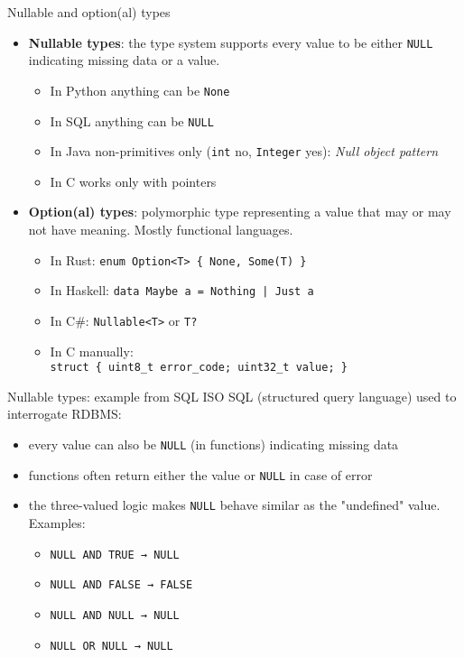 \documentclass[aspectratio=169,14pt]{beamer}
\begin{document}
\begin{frame}{Nullable and option(al) types}
\begin{itemize}
    \item \textbf{Nullable types}: the type system supports every value to be either \texttt{NULL} indicating missing data or a value.
    \begin{itemize}
        \item In Python anything can be \texttt{None}
        \item In SQL anything can be \texttt{NULL}
        \item In Java non-primitives only (\texttt{int} no, \texttt{Integer} yes): \textit{Null object pattern}
        \item In C works only with pointers
    \end{itemize}
    \item \textbf{Option(al) types}: polymorphic type representing a value that may or may not have meaning. Mostly functional languages.
    \begin{itemize}
        \item In Rust: \texttt{enum Option<T> \{ None, Some(T) \}}
        \item In Haskell: \texttt{data Maybe a = Nothing | Just a}
        \item In C\#: \texttt{Nullable<T>} or \texttt{T?}
        \item In C manually:\\ \texttt{struct \{ uint8\_t error\_code; uint32\_t value; \}}
    \end{itemize}
\end{itemize}
\end{frame}



\begin{frame}{Nullable types: example from SQL}
ISO SQL (structured query language) used to interrogate RDBMS:

\begin{itemize}
    \item every value can also be \texttt{NULL} (in functions) indicating missing data
    \item functions often return either the value or \texttt{NULL} in case of error
    \item the three-valued logic makes \texttt{NULL} behave similar as the "undefined" value. Examples:
    \begin{itemize}
        \item \texttt{NULL AND  TRUE → NULL}
        \item \texttt{NULL AND FALSE → FALSE}
        \item \texttt{NULL AND  NULL → NULL}
        \item \texttt{NULL  OR  NULL → NULL}
    \end{itemize}
\end{itemize}
\end{frame}
\end{document}
